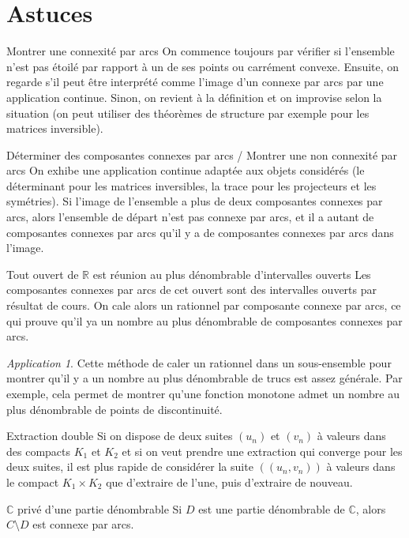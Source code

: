 \documentclass[french]{book}
\newcommand{\R}{\mathbb{R}}
\newcommand{\C}{\mathbb{C}}
\theoremstyle{plain}
\theoremstyle{definition}
\theoremstyle{remark}
\newtheorem*{app}{Application}
\begin{document}
\section{Astuces}
\begin{AS}{Montrer une connexité par arcs} On commence toujours par vérifier si l'ensemble n'est pas étoilé par rapport à un de ses points ou carrément convexe. Ensuite, on regarde s'il peut être interprété comme l'image d'un connexe par arcs par une application continue. Sinon, on revient à la définition et on improvise selon la situation (on peut utiliser des théorèmes de structure par exemple pour les matrices inversible).
\end{AS}
\begin{AS}{Déterminer des composantes connexes par arcs / Montrer une non connexité par arcs} On exhibe une application continue adaptée aux objets considérés (le déterminant pour les matrices inversibles, la trace pour les projecteurs et les symétries). Si l'image de l'ensemble a plus de deux composantes connexes par arcs, alors l'ensemble de départ n'est pas connexe par arcs, et il a autant de composantes connexes par arcs qu'il y a de composantes connexes par arcs dans l'image.
\end{AS}
\begin{AS}{Tout ouvert de $\R$ est réunion au plus dénombrable d'intervalles ouverts} Les composantes connexes par arcs de cet ouvert sont des intervalles ouverts par résultat de cours. On cale alors un rationnel par composante connexe par arcs, ce qui prouve qu'il ya un nombre au plus dénombrable de composantes connexes par arcs.
\end{AS}
\begin{app}
	Cette méthode de caler un rationnel dans un sous-ensemble pour montrer qu'il y a un nombre au plus dénombrable de trucs est assez générale. Par exemple, cela permet de montrer qu'une fonction monotone admet un nombre au plus dénombrable de points de discontinuité.
\end{app}
\begin{AS}{Extraction double} Si on dispose de deux suites $(u_n)$ et $(v_n)$ à valeurs dans des compacts $K_1$ et $K_2$ et si on veut prendre une extraction qui converge pour les deux suites, il est plus rapide de considérer la suite $((u_n,v_n))$ à valeurs dans le compact $K_1\times K_2$ que d'extraire de l'une, puis d'extraire de nouveau.
\end{AS}
\begin{AS}{$\C$ privé d'une partie dénombrable} Si $D$ est une partie dénombrable de $\C$, alors $C\setminus D$ est connexe par arcs.
\end{AS}
\end{document}
